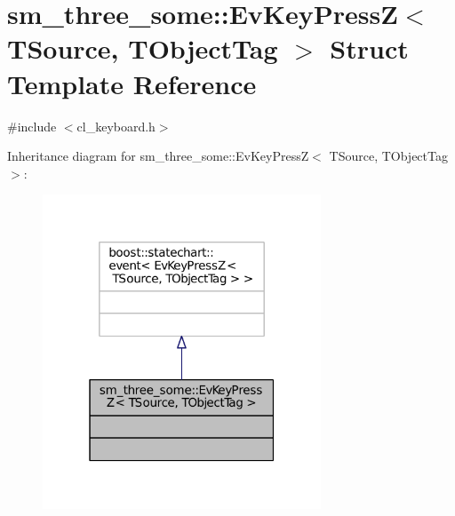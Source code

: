 \hypertarget{structsm__three__some_1_1EvKeyPressZ}{}\section{sm\+\_\+three\+\_\+some\+:\+:Ev\+Key\+PressZ$<$ T\+Source, T\+Object\+Tag $>$ Struct Template Reference}
\label{structsm__three__some_1_1EvKeyPressZ}


{\ttfamily \#include $<$cl\+\_\+keyboard.\+h$>$}



Inheritance diagram for sm\+\_\+three\+\_\+some\+:\+:Ev\+Key\+PressZ$<$ T\+Source, T\+Object\+Tag $>$\+:
\nopagebreak
\begin{figure}[H]
\begin{center}
\leavevmode
\includegraphics[width=235pt]{structsm__three__some_1_1EvKeyPressZ__inherit__graph}
\end{center}
\end{figure}


